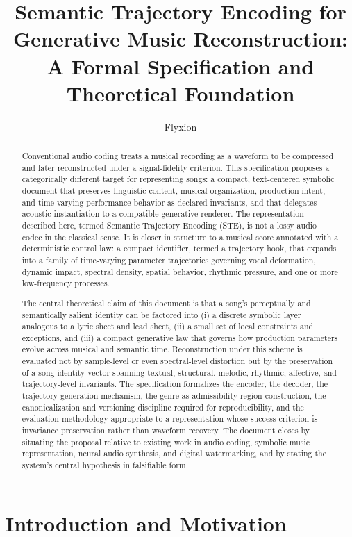 \documentclass[11pt]{article}
\title{\Large Semantic Trajectory Encoding for Generative Music Reconstruction:\\
A Formal Specification and Theoretical Foundation}
\author{Flyxion}
\affil{Independent Researcher}
\date{}
\begin{document}
\maketitle

\begin{abstract}
\noindent
Conventional audio coding treats a musical recording as a waveform to be compressed and later reconstructed under a signal-fidelity criterion. This specification proposes a categorically different target for representing songs: a compact, text-centered symbolic document that preserves linguistic content, musical organization, production intent, and time-varying performance behavior as declared invariants, and that delegates acoustic instantiation to a compatible generative renderer. The representation described here, termed Semantic Trajectory Encoding (STE), is not a lossy audio codec in the classical sense. It is closer in structure to a musical score annotated with a deterministic control law: a compact identifier, termed a trajectory hook, that expands into a family of time-varying parameter trajectories governing vocal deformation, dynamic impact, spectral density, spatial behavior, rhythmic pressure, and one or more low-frequency processes.

The central theoretical claim of this document is that a song's perceptually and semantically salient identity can be factored into (i) a discrete symbolic layer analogous to a lyric sheet and lead sheet, (ii) a small set of local constraints and exceptions, and (iii) a compact generative law that governs how production parameters evolve across musical and semantic time. Reconstruction under this scheme is evaluated not by sample-level or even spectral-level distortion but by the preservation of a song-identity vector spanning textual, structural, melodic, rhythmic, affective, and trajectory-level invariants. The specification formalizes the encoder, the decoder, the trajectory-generation mechanism, the genre-as-admissibility-region construction, the canonicalization and versioning discipline required for reproducibility, and the evaluation methodology appropriate to a representation whose success criterion is invariance preservation rather than waveform recovery. The document closes by situating the proposal relative to existing work in audio coding, symbolic music representation, neural audio synthesis, and digital watermarking, and by stating the system's central hypothesis in falsifiable form.
\end{abstract}

\section{Introduction and Motivation}
\end{document}

